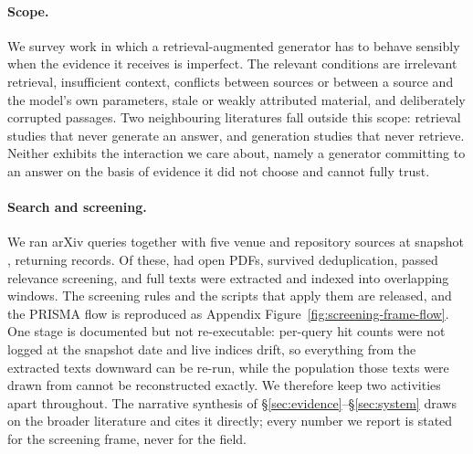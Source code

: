 \paragraph{Scope.}
We survey work in which a retrieval-augmented generator has to behave sensibly when the
evidence it receives is imperfect. The relevant conditions are irrelevant retrieval,
insufficient context, conflicts between sources or between a source and the model's own
parameters, stale or weakly attributed material, and deliberately corrupted passages. Two
neighbouring literatures fall outside this scope: retrieval studies that never generate an
answer, and generation studies that never retrieve. Neither exhibits the interaction we care
about, namely a generator committing to an answer on the basis of evidence it did not choose
and cannot fully trust.

\paragraph{Search and screening.}
We ran \FlowQueries{} arXiv queries together with five venue and repository sources at
snapshot \FlowSnapshot{}, returning \FlowRetrieved{} records. Of these, \FlowOpenPDF{} had
open PDFs, \FlowDedup{} survived deduplication, \FlowScreened{} passed relevance screening,
and \FlowTexts{} full texts were extracted and indexed into overlapping windows. The
screening rules and the scripts that apply them are released, and the PRISMA flow is
reproduced as Appendix Figure~\ref{fig:screening-frame-flow}. One stage is documented but not
re-executable: per-query hit counts were not logged at the snapshot date and live indices
drift, so everything from the \FlowTexts{} extracted texts downward can be re-run, while the
population those texts were drawn from cannot be reconstructed exactly. We therefore keep two
activities apart throughout. The narrative synthesis of
\S\ref{sec:evidence}--\S\ref{sec:system} draws on the broader literature and cites it
directly; every number we report is stated for the screening frame, never for the field.

